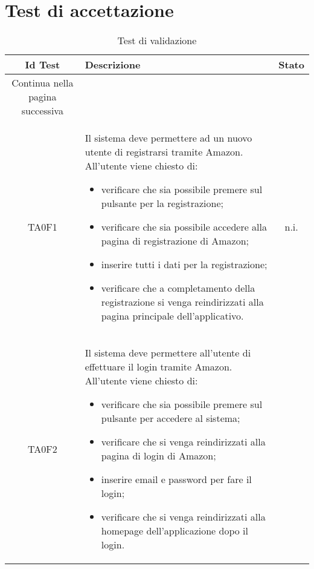 \section{Test di accettazione}

\begin{center}
\renewcommand{\arraystretch}{2.2}

\begin{longtable}{ c m{12cm} c }
	
	\rowcolor[HTML]{232f3e}

	\rowcolors{3}{tableRow}{}
	\color[HTML]{FFFFFF} \textbf{Id Test} & \color[HTML]{FFFFFF} \centering\textbf{Descrizione} & \color[HTML]{FFFFFF} \textbf{Stato} \\
\endhead
\rowcolor{white}\multicolumn{2}{c}
   { Continua nella pagina successiva} \\
   \endfoot
   \caption [Test di validazione]{Test di validazione}
	\label{tabella:testVal}
   \endlastfoot
	TA0F1  & Il sistema deve permettere ad un nuovo utente di registrarsi tramite Amazon. All'utente viene chiesto di: 
	\begin{itemize}
		\item verificare che sia possibile premere sul pulsante per la registrazione;
		\item verificare che sia possibile accedere alla pagina di registrazione di Amazon;
		\item inserire tutti i dati per la registrazione;
		\item verificare che a completamento della registrazione si venga reindirizzati alla pagina principale dell'applicativo.
	\end{itemize} 																																								& n.i. \\ 
	TA0F2  & Il sistema deve permettere all'utente di effettuare il login tramite Amazon. All'utente viene chiesto di:
	 \begin{itemize}
		\item verificare che sia possibile premere sul pulsante per accedere al sistema;
		\item verificare che si venga reindirizzati alla pagina di login di Amazon;
		\item inserire email e password per fare il login;
		\item verificare che si venga reindirizzati alla homepage dell’applicazione dopo il login.

\end{itemize}
\end{longtable}
\end{center}
